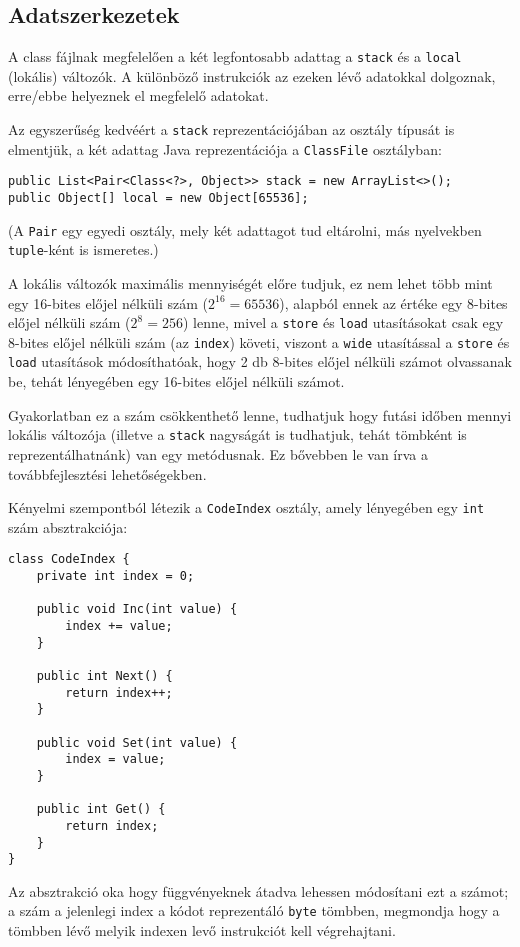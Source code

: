 \subsection{Adatszerkezetek}

A class fájlnak megfelelően a két legfontosabb adattag a \lstinline{stack} és a \lstinline{local} (lokális) változók. A különböző instrukciók az ezeken lévő adatokkal dolgoznak, erre/ebbe helyeznek el megfelelő adatokat.

Az egyszerűség kedvéért a \lstinline{stack} reprezentációjában az osztály típusát is elmentjük, a két adattag Java reprezentációja a \lstinline{ClassFile} osztályban:
\begin{verbatim}
public List<Pair<Class<?>, Object>> stack = new ArrayList<>();
public Object[] local = new Object[65536];
\end{verbatim}
(A \lstinline{Pair} egy egyedi osztály, mely két adattagot tud eltárolni, más nyelvekben \lstinline{tuple}-ként is ismeretes.)

A lokális változók maximális mennyiségét előre tudjuk, ez nem lehet több mint egy 16-bites előjel nélküli szám ($2^{16} = 65536$), alapból ennek az értéke egy 8-bites előjel nélküli szám ($2^8 = 256$) lenne, mivel a \lstinline{store} és \lstinline{load} utasításokat csak egy 8-bites előjel nélküli szám (az \lstinline{index}) követi, viszont a \lstinline{wide} utasítással a \lstinline{store} és \lstinline{load} utasítások módosíthatóak, hogy 2 db 8-bites előjel nélküli számot olvassanak be, tehát lényegében egy 16-bites előjel nélküli számot.

Gyakorlatban ez a szám csökkenthető lenne, tudhatjuk hogy futási időben mennyi lokális változója (illetve a \lstinline{stack} nagyságát is tudhatjuk, tehát tömbként is reprezentálhatnánk) van egy metódusnak. Ez bővebben le van írva a továbbfejlesztési lehetőségekben.

Kényelmi szempontból létezik a \lstinline{CodeIndex} osztály, amely lényegében egy \lstinline{int} szám absztrakciója:
\begin{verbatim}
class CodeIndex {
    private int index = 0;

    public void Inc(int value) {
        index += value;
    }

    public int Next() {
        return index++;
    }

    public void Set(int value) {
        index = value;
    }

    public int Get() {
        return index;
    }
}
\end{verbatim}
Az absztrakció oka hogy függvényeknek átadva lehessen módosítani ezt a számot; a szám a jelenlegi index a kódot reprezentáló \lstinline{byte} tömbben, megmondja hogy a tömbben lévő melyik indexen levő instrukciót kell végrehajtani.

